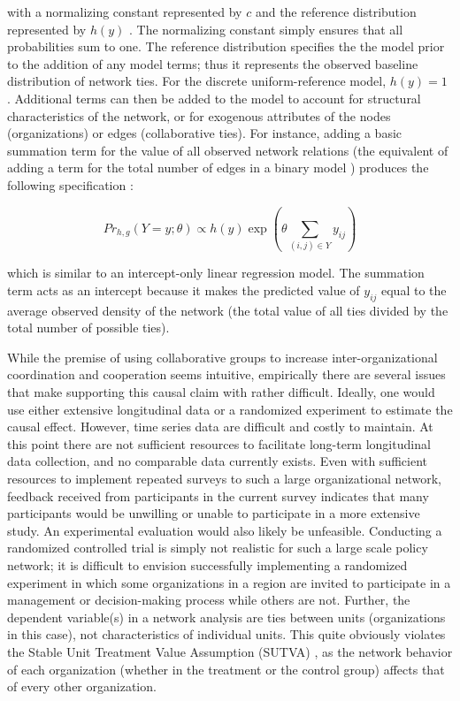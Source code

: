 \documentclass[12pt,a4paper,titlepage]{article}
\begin{document}
with a normalizing constant represented by $c$ and the reference distribution represented by $h(y)$ \parencite{krivitsky2013}. The normalizing constant simply ensures that all probabilities sum to one. The reference distribution specifies the the model prior to the addition of any model terms; thus it represents the observed baseline distribution of network ties. For the discrete uniform-reference model, $h(y) = 1$ \parencite{krivitsky2012}. Additional terms can then be added to the model to account for structural characteristics of the network, or for exogenous attributes of the nodes (organizations) or edges (collaborative ties). For instance, adding a basic summation term for the value of all observed network relations (the equivalent of adding a term for the total number of edges in a binary model ) produces the following specification \parencite{krivitsky2013}:

\begin{equation}
Pr_{h,g} (Y = y; \theta) \propto h(y) \exp(\theta \sum_{(i,j) \in Y} y_{ij})
\label{eq:Term}
\end{equation}

which is similar to an intercept-only linear regression model. The summation term acts as an intercept because it makes the predicted value of $y_{ij}$ equal to the average observed density of the network (the total value of all ties divided by the total number of possible ties).

While the premise of using collaborative groups to increase inter-organizational coordination and cooperation seems intuitive, empirically there are several issues that make supporting this causal claim with rather difficult. Ideally, one would use either extensive longitudinal data or a randomized experiment to estimate the causal effect. However, time series data are difficult and costly to maintain. At this point there are not sufficient resources to facilitate long-term longitudinal data collection, and no comparable data currently exists. Even with sufficient resources to implement repeated surveys to such a large organizational network, feedback received from participants in the current survey indicates that many participants would be unwilling or unable to participate in a more extensive study. An experimental evaluation would also likely be unfeasible. Conducting a randomized controlled trial is simply not realistic for such a large scale policy network; it is difficult to envision successfully implementing a randomized experiment in which some organizations in a region are invited to participate in a management or decision-making process while others are not. Further, the dependent variable(s) in a network analysis are ties between units (organizations in this case), not characteristics of individual units. This quite obviously violates the Stable Unit Treatment Value Assumption (SUTVA) \parencite{rubin1986, pearl2000}, as the network behavior of each organization (whether in the treatment or the control group) affects that of every other organization.
\end{document}

